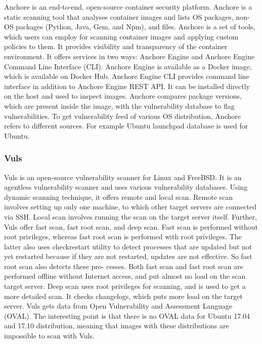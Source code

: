 \documentclass[a4paper,num-refs]{oup-contemporary}
\begin{document}
Anchore is an end-to-end, open-source container security platform. Anchore
is a static
scanning tool that analyses container images and lists OS
packages, non-OS packages (Python, Java, Gem, and Npm), and files.
Anchore is a set of tools, which users can
employ for scanning container images and applying custom policies to them.
It provides visibility and transparency of the container environment.
It offers services in two ways: Anchore Engine and Anchore Engine
Command Line Interface (CLI). Anchore Engine is available as a Docker
image, which is available on Docker Hub. Anchore Engine CLI provides
command line interface in addition to Anchore Engine REST API. It can be
installed directly on the host and used to inspect images.
Anchore compares package versions, which are present inside the
image, with the vulnerability database to flag vulnerabilities.
To get vulnerability feed of various OS distribution, Anchore refers to
different sources. For example Ubuntu launchpad database is used for Ubuntu. 
\subsubsection{Vuls}

Vuls is an open-source vulnerability scanner for Linux and FreeBSD.
It is an agentless vulnerability scanner and uses various
vulnerability databases. Using dynamic scanning technique, it offers
remote and local scan. Remote scan involves setting up only one machine, to
which other target servers are connected via SSH. Local scan involves running
the scan on the target server itself. Further, Vuls offer fast scan, fast root scan,
and deep scan.
Fast scan is performed without root privileges, whereas fast root scan is
performed with root privileges. The latter also uses checkrestart utility to 
detect processes that are updated but not yet restarted because if they are not
restarted, updates are not effective. So fast root scan also detects these pro-
cesses. Both fast scan and fast root scan are performed offline without Internet
access, and put almost no load on the scan target server. Deep scan uses
root privileges for scanning, and is used to get a more detailed scan. It checks
changelogs, which puts more load on the target server.
Vuls gets data from Open Vulnerability and Assessment Language (OVAL).
The interesting point is that there is no OVAL data for Ubuntu 17.04 and 17.10 distribution,
meaning that images with these distributions are impossible to scan with Vuls.
\end{document}
